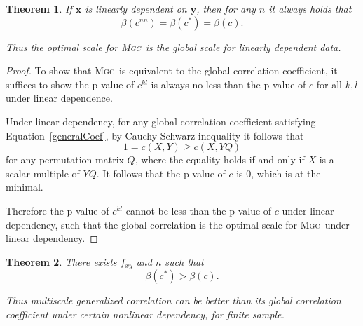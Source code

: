 \documentclass[11pt]{article}
\providecommand{\sct}[1]{{\normalfont\textsc{#1}}}
\providecommand{\mb}[1]{\boldsymbol{#1}}
\newcommand{\G}{c}
\newcommand{\Mgc}{\sct{Mgc}}
\newtheorem{appThm}{Theorem}
\begin{document}
\begin{appThm}
\label{at:linear}
If $\mb{x}$ is linearly dependent on $\mb{y}$, then for any $n$ it always holds that
\begin{equation*}
\beta(\G^{nn}) = \beta(\G^{*}) = \beta(\G).
\end{equation*}

Thus the optimal scale for \Mgc~is the global scale for linearly dependent data.
\end{appThm}

\begin{proof}
To show that \Mgc~is equivalent to the global correlation coefficient, it suffices to show the p-value of $\G^{kl}$ is always no less than the p-value of $\G$ for all $k,l$ under linear dependence.

Under linear dependency, for any global correlation coefficient satisfying Equation~\ref{generalCoef}, by Cauchy-Schwarz inequality it follows that
\begin{equation*}
1=\G(X, Y) \geq \G(X, YQ)
\end{equation*}
for any permutation matrix $Q$, where the equality holds if and only if $X$ is a scalar multiple of $YQ$. It follows that the p-value of $\G$ is $0$, which is at the minimal.

Therefore the p-value of $\G^{kl}$ cannot be less than the p-value of $\G$ under linear dependency, such that the global correlation is the optimal scale for \Mgc~under linear dependency.
\end{proof}


\begin{appThm}
There exists $f_{xy}$ and $n$ such that
\begin{equation*}
\beta(\G^{*}) > \beta(\G).
\end{equation*}

Thus multiscale generalized correlation can be better than its global correlation coefficient under certain nonlinear dependency, for finite sample.
\end{appThm}
\end{document}
